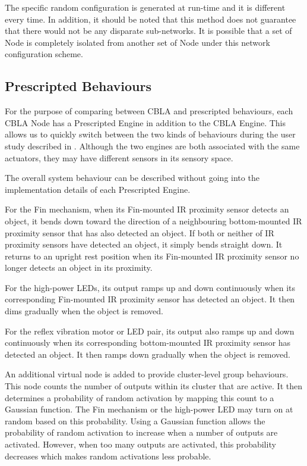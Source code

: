 The specific random configuration is generated at run-time and it is different every time. In addition, it should be noted that this method does not guarantee that there would not be any disparate sub-networks. It is possible that a set of Node is completely isolated from another set of Node under this network configuration scheme.

\subsection{Prescripted Behaviours}\label{sec:prescripted-behaviours}

For the purpose of comparing between CBLA and prescripted behaviours, each CBLA Node has a Prescripted Engine in addition to the CBLA Engine. This allows us to quickly switch between the two kinds of behaviours during the user study described in . Although the two engines are both associated with the same actuators, they may have different sensors in its sensory space. 

The overall system behaviour can be described without going into the implementation details of each Prescripted Engine.

For the Fin mechanism, when its Fin-mounted IR proximity sensor detects an object, it bends down toward the direction of a neighbouring bottom-mounted IR proximity sensor that has also detected an object. If both or neither of IR proximity sensors have detected an object, it simply bends straight down. It returns to an upright rest position when its Fin-mounted IR proximity sensor no longer detects an object in its proximity.

For the high-power LEDs, its output ramps up and down continuously when its corresponding Fin-mounted IR proximity sensor has detected an object. It then dims gradually when the object is removed.

For the reflex vibration motor or LED pair, its output also ramps up and down continuously when its corresponding bottom-mounted IR proximity sensor has detected an object. It then ramps down gradually when the object is removed.

An additional virtual node is added to provide cluster-level group behaviours. This node counts the number of outputs within its cluster that are active. It then determines a probability of random activation by mapping this count to a Gaussian function. The Fin mechanism or the high-power LED may turn on at random based on this probability. Using a Gaussian function allows the probability of random activation to increase when a number of outputs are activated. However, when too many outputs are activated, this probability decreases which makes random activations less probable. 


